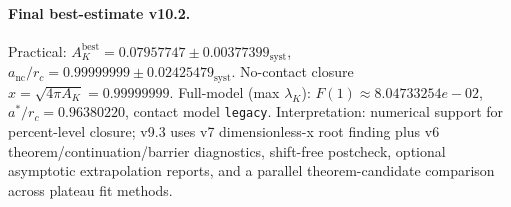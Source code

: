 \paragraph{Final best-estimate v10.2.}
Practical: $A_K^{\mathrm{best}} = 0.07957747 \pm 0.00377399_{\mathrm{syst}}$, $a_{\mathrm{nc}}/r_c = 0.99999999 \pm 0.02425479_{\mathrm{syst}}$.
No-contact closure $x = \sqrt{4\pi A_K} = 0.99999999$.
Full-model (max $\lambda_K$): $F(1) \approx 8.04733254e-02$, $a^*/r_c = 0.96380220$, contact model \texttt{legacy}.
Interpretation: numerical support for percent-level closure; v9.3 uses v7 dimensionless-x root finding plus v6 theorem/continuation/barrier diagnostics, shift-free postcheck, optional asymptotic extrapolation reports, and a parallel theorem-candidate comparison across plateau fit methods.
